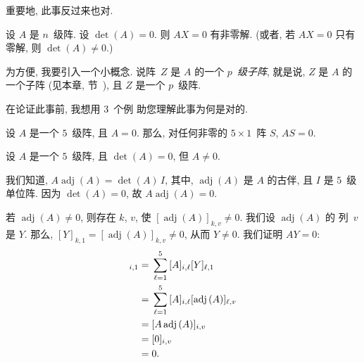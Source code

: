 \documentclass[../libro.tex]{subfiles}
\begin{document}
重要地, 此事反过来也对.

\begin{theorem}
    设 \(A\) 是 \(n\)~级阵.
    设 \(\det {(A)} = 0\).
    则 \(AX = 0\) 有非零解.
    (或者, %
    若 \(AX = 0\) 只有零解,
    则 \(\det {(A)} \neq 0\).) %
\end{theorem}

为方便, 我要引入一个小概念.
说阵~\(Z\) 是 \(A\) 的一个 \emph{\(p\)~级子阵},
就是说, \(Z\) 是 \(A\) 的一个子阵
(见本章, 节~),
且 \(Z\) 是一个 \(p\)~级阵.

在论证此事前, 我想用 \(3\)~个例%
助您理解此事为何是对的.

\begin{example}
    设 \(A\) 是一个 \(5\)~级阵,
    且 \(A = 0\).
    那么, 对任何非零的 \(5 \times 1\)~阵 \(S\),
    \(AS = 0\).
\end{example}

\begin{example}
    设 \(A\) 是一个 \(5\)~级阵,
    且 \(\det {(A)} = 0\),
    但 \(A \neq 0\).

    我们知道,
    \(A \operatorname{adj} {(A)} = \det {(A)}\, I\),
    其中, \(\operatorname{adj} {(A)}\)
    是 \(A\) 的古伴,
    且 \(I\) 是 \(5\)~级单位阵.
    因为 \(\det {(A)} = 0\),
    故 \(A \operatorname{adj} {(A)} = 0\).

    若 \(\operatorname{adj} {(A)} \neq 0\),
    则存在 \(k\), \(v\), 使
    \([\operatorname{adj} {(A)}]_{k,v} \neq 0\).
    我们设 \(\operatorname{adj} {(A)}\) 的%
    列~\(v\) 是 \(Y\).
    那么, \([Y]_{k,1}
    = [\operatorname{adj} {(A)}]_{k,v} \neq 0\),
    从而 \(Y \neq 0\).
    我们证明 \(AY = 0\):
    \begin{align*}
        [AY]_{i,1}
        = {} &
        \sum_{\ell = 1}^{5}
        {[A]_{i,\ell} [Y]_{\ell,1}}
        \\
        = {} &
        \sum_{\ell = 1}^{5}
        {[A]_{i,\ell} [\operatorname{adj} {(A)}]_{\ell,v}}
        \\
        = {} &
        [A \operatorname{adj} {(A)}]_{i,v}
        \\
        = {} &
        [0]_{i,v}
        \\
        = {} &
        0.
        \qefhere
    \end{align*}
\end{example}
\end{document}
